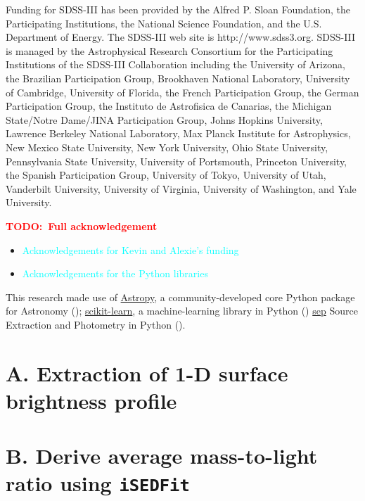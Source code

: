 \documentclass[preprint]{aastex}
\newcommand{\todo}[1]{\textcolor{red}{\textbf{TODO:~#1}}}
\newcommand{\plan}[1]{\textcolor{cyan}{#1}}
\begin{document}
\begin{CJK*}{UTF8}{gbsn}
  Funding for SDSS-III has been provided by the Alfred P. Sloan Foundation, the
  Participating Institutions, the National Science Foundation, and the U.S.  Department of
  Energy. The SDSS-III web site is http://www.sdss3.org.  SDSS-III is managed by the
  Astrophysical Research Consortium for the Participating Institutions of the SDSS-III
  Collaboration including the University of Arizona, the Brazilian Participation Group,
  Brookhaven National Laboratory, University of Cambridge, University of Florida, the
  French Participation Group, the German Participation Group, the Instituto de Astrofisica
  de Canarias, the Michigan State/Notre Dame/JINA Participation Group, Johns Hopkins
  University, Lawrence Berkeley National Laboratory, Max Planck Institute for
  Astrophysics, New Mexico State University, New York University, Ohio State University,
  Pennsylvania State University, University of Portsmouth, Princeton University, the
  Spanish Participation Group, University of Tokyo, University of Utah, Vanderbilt
  University, University of Virginia, University of Washington, and Yale University.
  
  \todo{Full acknowledgement}\\
  \begin{itemize}
      \item \plan{Acknowledgements for Kevin and Alexie's funding}
      \item \plan{Acknowledgements for the Python libraries}
  \end{itemize}

  This research made use of 
  \href{http://www.astropy.org/}{Astropy}, a community-developed 
      core Python package for Astronomy (\citealt{astropy13}); 
  \href{http://scikit-learn.org/stable/index.html}{scikit-learn},
      a machine-learning library in Python (\citealt{scikit-learn}) 
  \href{https://github.com/kbarbary/sep}{sep} 
      Source Extraction and Photometry in Python (\citealt{PythonSEP}).





\appendix

\section{A. Extraction of 1-D surface brightness profile} 

\section{B. Derive average mass-to-light ratio using \texttt{iSEDFit}} 


\end{CJK*}
\end{document}
